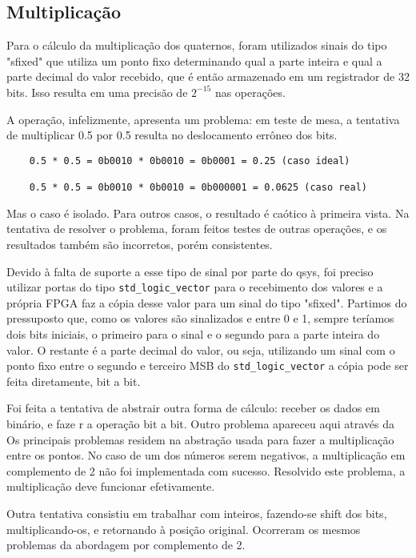 \documentclass [12pt,oneside] {article}
\begin{document}
\subsection{Multiplicação}

	Para o cálculo da multiplicação dos quaternos, foram
utilizados sinais do tipo "sfixed" que utiliza um ponto fixo
determinando qual a parte inteira e qual a parte decimal do valor
recebido, que é então armazenado em um registrador de 32 bits. Isso
resulta em uma precisão de $2^{-15}$ nas operações.

	A operação, infelizmente, apresenta um problema: em teste de
mesa, a tentativa de multiplicar 0.5 por 0.5 resulta no deslocamento
errôneo dos bits.

\begin{footnotesize}
\begin{verbatim}
	0.5 * 0.5 = 0b0010 * 0b0010 = 0b0001 = 0.25 (caso ideal)

	0.5 * 0.5 = 0b0010 * 0b0010 = 0b000001 = 0.0625 (caso real)
\end{verbatim}
\end{footnotesize}

Mas o caso é isolado. Para outros casos, o resultado é caótico à
primeira vista. Na tentativa de resolver o problema, foram feitos testes de outras
operações, e os resultados também são incorretos, porém consistentes.

	Devido à falta de suporte a esse tipo de sinal por parte do
qsys, foi preciso utilizar portas do tipo \texttt{std\_logic\_vector} para o recebimento dos
valores e a própria FPGA faz a cópia desse valor para um sinal do tipo
"sfixed". Partimos do pressuposto que, como os valores são sinalizados
e entre 0 e 1, sempre teríamos dois bits iniciais, o primeiro para o
sinal e o segundo para a parte inteira do valor. O restante é a
parte decimal do valor, ou seja, utilizando um sinal com o ponto fixo
entre o segundo e terceiro MSB do \texttt{std\_logic\_vector} a cópia pode ser
feita diretamente, bit a bit.

	Foi feita a tentativa de abstrair outra forma de cálculo:
receber os dados em binário, e faze r a operação bit a bit. Outro
problema apareceu aqui através da  Os principais problemas residem na
abstração usada para fazer a multiplicação entre os pontos. No caso de
um dos números serem negativos, a multiplicação em complemento de 2
não foi implementada com sucesso. Resolvido este problema, a
multiplicação deve funcionar efetivamente.

	Outra tentativa consistiu em trabalhar com inteiros,
fazendo-se shift dos bits, multiplicando-os, e retornando à posição
original. Ocorreram os mesmos problemas da abordagem por complemento
de 2.
\end{document}
